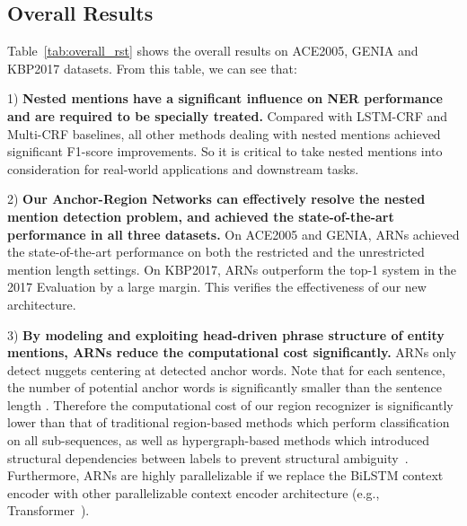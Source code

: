 \documentclass[11pt,a4paper]{article}
\begin{document}
\subsection{Overall Results}
Table~\ref{tab:overall_rst} shows the overall results on ACE2005, GENIA and KBP2017 datasets. From this table, we can see that:

1) \textbf{Nested mentions have a significant influence on NER performance and are required to be specially treated.} Compared with LSTM-CRF and Multi-CRF baselines, all other methods dealing with nested mentions achieved significant F1-score improvements. So it is critical to take nested mentions into consideration for real-world applications and downstream tasks.

2) \textbf{Our Anchor-Region Networks can effectively resolve the nested mention detection problem, and achieved the state-of-the-art performance in all three datasets.} On ACE2005 and GENIA, ARNs achieved the state-of-the-art performance on both the restricted and the unrestricted mention length settings. On KBP2017, ARNs outperform the top-1 system in the 2017 Evaluation by a large margin. This verifies the effectiveness of our new architecture.

3) \textbf{By modeling and exploiting head-driven phrase structure of entity mentions, ARNs reduce the computational cost significantly.} ARNs only detect nuggets centering at detected anchor words. Note that for each sentence, the number of potential anchor words  is significantly smaller than the sentence length . Therefore the computational cost of our region recognizer is significantly lower than that of traditional region-based methods which perform classification on all sub-sequences, as well as hypergraph-based methods which introduced structural dependencies between labels to prevent structural ambiguity~\cite{D18-1019}. Furthermore, ARNs are highly parallelizable if we replace the BiLSTM context encoder with other parallelizable context encoder architecture (e.g., Transformer~\cite{NIPS2017_7181}).
\end{document}
